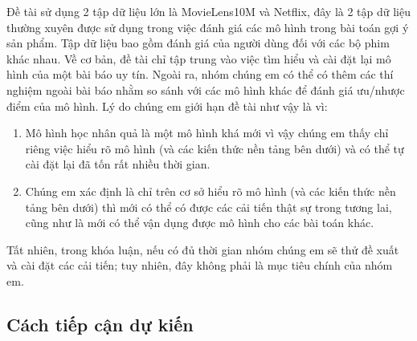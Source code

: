 \documentclass{article}[14pt]
\begin{document}
{    Đề tài sử dụng 2 tập dữ liệu lớn là MovieLens10M và Netflix, đây là 2 tập dữ liệu thường xuyên được sử dụng trong việc đánh giá các mô hình trong bài toán gợi ý sản phẩm. Tập dữ liệu bao gồm đánh giá của người dùng đối với các bộ phim khác nhau. Về cơ bản, đề tài chỉ tập trung vào việc tìm hiểu và cài đặt lại mô hình của một bài báo uy tín. Ngoài ra, nhóm chúng em có thể có thêm các thí nghiệm ngoài bài báo nhằm so sánh với các mô hình khác để đánh giá ưu/nhược điểm của mô hình. Lý do chúng em giới hạn đề tài như vậy là vì: 
    \begin{enumerate}[label=(\roman*)]
        \item Mô hình học nhân quả là một mô hình khá mới vì vậy chúng em thấy chỉ riêng việc hiểu rõ mô hình (và các kiến thức nền tảng bên dưới) và có thể tự cài đặt lại đã tốn rất nhiều thời gian.
        \item Chúng em xác định là chỉ trên cơ sở hiểu rõ mô hình (và các kiến thức nền tảng bên dưới) thì mới có thể có được các cải tiến thật sự trong tương lai, cũng như là mới có thể vận dụng được mô hình cho các bài toán khác.
    \end{enumerate}
    Tất nhiên, trong khóa luận, nếu có đủ thời gian nhóm chúng em sẽ thử đề xuất và cài đặt các cải tiến; tuy nhiên, đây không phải là mục tiêu chính của nhóm em.
    
    \subsection{Cách tiếp cận dự kiến}
    
}
\end{document}
